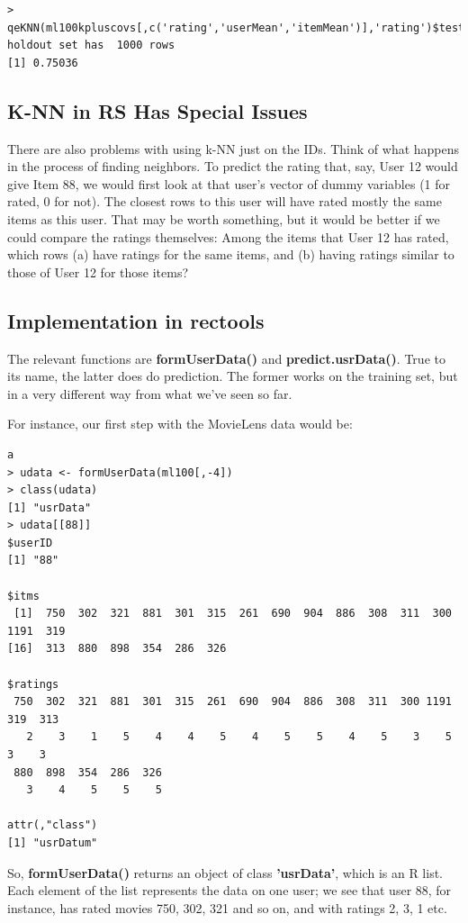 \begin{lstlisting}
> qeKNN(ml100kpluscovs[,c('rating','userMean','itemMean')],'rating')$testAcc
holdout set has  1000 rows
[1] 0.75036
\end{lstlisting}

\subsection{K-NN in RS Has Special Issues}

There are also problems with using k-NN just on the IDs.  Think of what
happens in the process of finding neighbors.  To predict the rating
that, say, User 12 would give Item 88, we would first look at that 
user's vector of dummy variables (1 for rated, 0 for not).  The closest
rows to this user will have rated mostly the same items as this user.
That may be worth something, but it would be better if we could compare
the ratings themselves:  Among the items that User 12 has rated, which
rows (a) have ratings for the same items, and (b) having ratings similar
to those of User 12 for those items?

\subsection{Implementation in rectools}

The relevant functions are \textbf{formUserData()} and
\textbf{predict.usrData()}.  True to its name, the latter does do
prediction.  The former works on the training set, but in a very
different way from what we've seen so far.

For instance, our first step with the MovieLens data would be:

\begin{lstlisting}a
> udata <- formUserData(ml100[,-4])
> class(udata)
[1] "usrData"
> udata[[88]]
$userID
[1] "88"

$itms
 [1]  750  302  321  881  301  315  261  690  904  886  308  311  300 1191  319
[16]  313  880  898  354  286  326

$ratings
 750  302  321  881  301  315  261  690  904  886  308  311  300 1191  319  313 
   2    3    1    5    4    4    5    4    5    5    4    5    3    5    3    3 
 880  898  354  286  326 
   3    4    5    5    5 

attr(,"class")
[1] "usrDatum"
\end{lstlisting}

So, \textbf{formUserData()} returns an object of class
\textbf{'usrData'}, which is an R list.  Each element of the list
represents the data on one user; we see that user 88, for instance, has
rated movies 750, 302, 321 and so on, and with ratings 2, 3, 1 etc.
 
